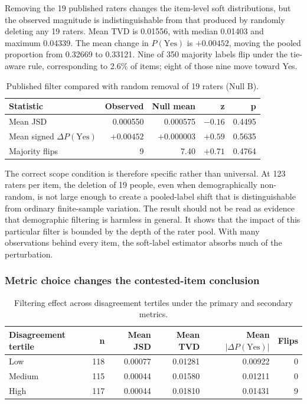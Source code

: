 \documentclass[11pt,a4paper]{article}
\begin{document}
Removing the 19 published raters changes the item-level soft distributions, but the observed
magnitude is indistinguishable from that produced by randomly deleting any 19 raters. Mean TVD is
0.01556, with median 0.01403 and maximum 0.04339. The mean change in $P(\text{Yes})$ is
$+0.00452$, moving the pooled proportion from 0.32669 to 0.33121. Nine of 350 majority labels
flip under the tie-aware rule, corresponding to 2.6\% of items; eight of those nine move toward
Yes.

\begin{table}[htbp]
\centering
\caption{Published filter compared with random removal of 19 raters (Null B).}
\label{tab:nullb-rq1}
\small\begin{tabular}{lrrrr}
\toprule
\textbf{Statistic} & \textbf{Observed} & \textbf{Null mean} & \textbf{z} & \textbf{p} \\
\midrule
Mean JSD & 0.000550 & 0.000575 & $-0.16$ & 0.4495 \\
Mean signed $\Delta P(\text{Yes})$ & $+0.00452$ & $+0.000003$ & $+0.59$ & 0.5635 \\
Majority flips & 9 & 7.40 & $+0.71$ & 0.4764 \\
\bottomrule
\end{tabular}
\end{table}

The correct scope condition is therefore specific rather than universal. At 123 raters per item,
the deletion of 19 people, even when demographically non-random, is not large enough to create a
pooled-label shift that is distinguishable from ordinary finite-sample variation. The result
should not be read as evidence that demographic filtering is harmless in general. It shows that
the impact of this particular filter is bounded by the depth of the rater pool. With many
observations behind every item, the soft-label estimator absorbs much of the perturbation.

\subsubsection{Metric choice changes the contested-item conclusion}

\begin{table}[htbp]
\centering
\caption{Filtering effect across disagreement tertiles under the primary and secondary metrics.}
\label{tab:tertiles}
\small\begin{tabular}{lrrrrr}
\toprule
\textbf{Disagreement tertile} & \textbf{n} & \textbf{Mean JSD} & \textbf{Mean TVD} &
\textbf{Mean $|\Delta P(\text{Yes})|$} & \textbf{Flips} \\
\midrule
Low & 118 & 0.00077 & 0.01281 & 0.00922 & 0 \\
Medium & 115 & 0.00044 & 0.01580 & 0.01211 & 0 \\
High & 117 & 0.00044 & 0.01810 & 0.01431 & 9 \\
\bottomrule
\end{tabular}
\end{table}
\end{document}
